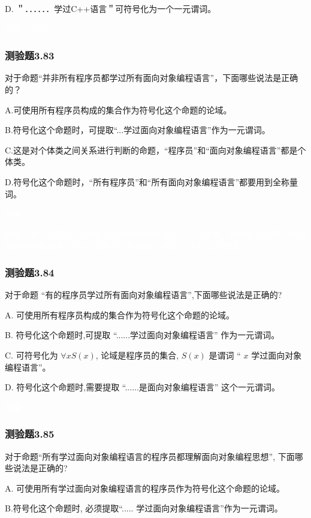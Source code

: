 \documentclass[UTF8, heading=true]{ctexart}
\begin{document}
D.  
＂．．．．．．学过C++语言＂可符号化为一个一元谓词。

\textcolor{white}{答案：ACD}

\subsubsection{测验题3.83}

对于命题“并非所有程序员都学过所有面向对象编程语言”，下面哪些说法是正确的？

A.可使用所有程序员构成的集合作为符号化这个命题的论域。

B.符号化这个命题时，可提取“...学过面向对象编程语言”作为一元谓词。

C.这是对个体类之间关系进行判断的命题，“程序员”和“面向对象编程语言”都是个体类。

D.符号化这个命题时，“所有程序员”和“所有面向对象编程语言”都要用到全称量词。

\textcolor{white}{答案：CD}

\textcolor{white}{解析：对于B选项，因为面向对象编程语言也是一个个体类，因此要先提取“...是面向对象编程语言”作为一元谓词，再提取“...学过...”作为二元谓词。}

\subsubsection{测验题3.84}

对于命题 “有的程序员学过所有面向对象编程语言”,下面哪些说法是正确的?

A. 可使用所有程序员构成的集合作为符号化这个命题的论域。

B.  符号化这个命题时,可提取 “......学过面向对象编程语言” 作为一元谓词。

C.   可符号化为 $\forall x S(x)$, 论域是程序员的集合, $S(x)$ 是谓词 “ $x$ 学过面向对象编程语言”。

D. 符号化这个命题时,需要提取 “......是面向对象编程语言” 这个一元谓词。

\textcolor{white}{答案：D}

\subsubsection{测验题3.85}

对于命题“所有学过面向对象编程语言的程序员都理解面向对象编程思想”, 下面哪些说法是正确的?

A. 可使用所有学过面向对象编程语言的程序员作为符号化这个命题的论域。

B.符号化这个命题时, 必须提取“..... 学过面向对象编程语言”作为一元谓词。
\end{document}
